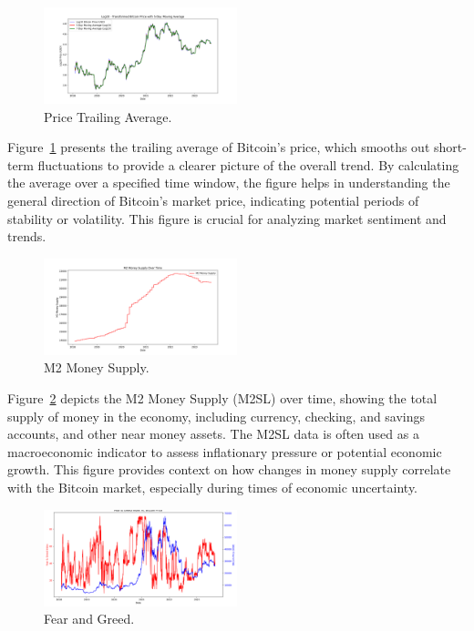 \begin{figure}[h]
    \centering
    \includegraphics[width=0.5\textwidth]{plots/trailing_average_plot.png} %
    \caption{Price Trailing Average.}
    \label{fig:trailing_average}
\end{figure}

Figure\ \ref{fig:trailing_average} presents the trailing average of Bitcoin's price, which smooths out short-term
fluctuations to provide a clearer picture of the overall trend. By calculating the average over a specified time
window, the figure helps in understanding the general direction of Bitcoin’s market price, indicating potential
periods of stability or volatility. This figure is crucial for analyzing market sentiment and trends.


\begin{figure}[h]
    \centering
    \includegraphics[width=0.5\textwidth]{plots/m2sl_plot.png} %
    \caption{M2 Money Supply.}
    \label{fig:m2sl}
\end{figure}

Figure\ \ref{fig:m2sl} depicts the M2 Money Supply (M2SL) over time, showing the total supply of money in the
economy, including currency, checking, and savings accounts, and other near money assets. The M2SL data is often
used as a macroeconomic indicator to assess inflationary pressure or potential economic growth. This figure provides
context on how changes in money supply correlate with the Bitcoin market, especially during times of economic uncertainty.


\begin{figure}[h]
    \centering
    \includegraphics[width=0.5\textwidth]{plots/fear_and_greed_plot.png} %
    \caption{Fear and Greed.}
    \label{fig:fear_and_greed}
\end{figure}

